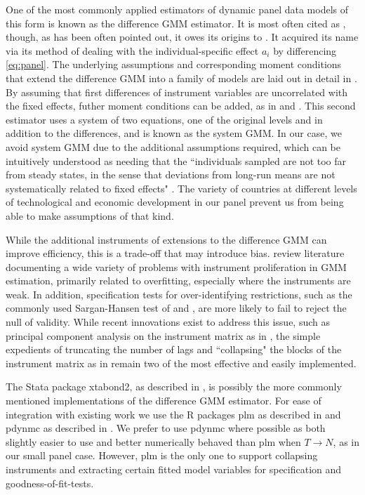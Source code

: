 \documentclass[12pt,a4paper]{article}
\newcommand{\pkg}[1]{{\fontseries{b}\selectfont #1}}
\begin{document}
One of the most commonly applied estimators of dynamic panel data models of this form is known as the difference GMM estimator.
It is most often cited as \cite{arellanoTestsSpecificationPanel1991}, though, as has been often pointed out, it owes its origins to \cite{holtz-eakinEstimatingVectorAutoregressions1988}.
It acquired its name via its method of dealing with the individual-specific effect $a_i$ by differencing \cref{eq:panel}.
The underlying assumptions and corresponding moment conditions that extend the difference GMM into a family of models are laid out in detail in \cite{fritschGMMEstimationLinear2019}.
By assuming that first differences of instrument variables are uncorrelated with the fixed effects, futher moment conditions can be added, as in \cite{arellanoAnotherLookInstrumental1995} and \cite{blundellInitialConditionsMoment1998}.
This second estimator uses a system of two equations, one of the original levels and in addition to the differences, and is known as the system GMM.
In our case, we avoid system GMM due to the additional assumptions required, which can be intuitively understood as needing that the ``individuals sampled are not too far from steady states, in the sense that deviations from long-run means are not
systematically related to fixed effects" \cite[p.128]{roodmanHowXtabond2Introduction2009}.
The variety of countries at different levels of technological and economic development in our panel prevent us from being able to make assumptions of that kind.

While the additional instruments of extensions to the difference GMM can improve efficiency, this is a trade-off that may introduce bias.
\cite{bontempiImplementingStrategyReduce2015} review literature documenting a wide variety of problems with instrument proliferation in GMM estimation, primarily related to overfitting, especially where the instruments are weak.
In addition, specification tests for over-identifying restrictions, such as the commonly used Sargan-Hansen test of \cite{sarganEstimationEconomicRelationships1958} and \cite{hansenLargeSampleProperties1982}, are more likely to fail to reject the null of validity.
While recent innovations exist to address this issue, such as principal component analysis on the instrument matrix as in \cite{bontempiImplementingStrategyReduce2015}, the simple expedients of truncating the number of lags and ``collapsing" the blocks of the instrument matrix as in \cite{roodmanNoteThemeToo2009} remain two of the most effective and easily implemented.

The Stata package \pkg{xtabond2}, as described in \cite{roodmanHowXtabond2Introduction2009}, is possibly the more commonly mentioned implementations of the difference GMM estimator.
For ease of integration with existing work we use the R packages \pkg{plm} as described in \cite{croissantPanelDataEconometrics2008} and \pkg{pdynmc} as described in \cite{fritschPdynmcPackageEstimating2019}.
We prefer to use \pkg{pdynmc} where possible as both slightly easier to use and better numerically behaved than \pkg{plm} when $T \rightarrow N$, as in our small panel case.
However, \pkg{plm} is the only one to support collapsing instruments and extracting certain fitted model variables for specification and goodness-of-fit-tests.
\end{document}
